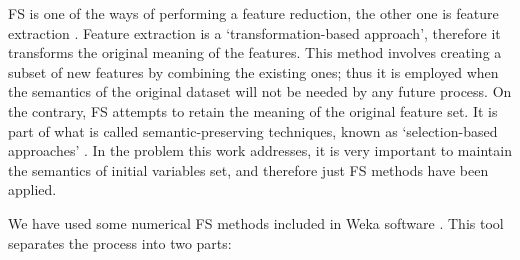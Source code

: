 \documentclass[a4paper,10pt,twocolumn,preprint,3p]{elsarticle}
\begin{document}
FS is one of the ways of performing a feature reduction, the other one is 
feature extraction \cite{kittler1986feature}. 
Feature extraction is a `transformation-based approach', therefore
it transforms the original meaning of the features. This method
involves creating a subset of new features by combining the
existing ones; thus it is employed when the semantics of the
original dataset will not be needed by any future process. On the
contrary, FS attempts to retain the meaning of the
original feature set. It is part of what is called semantic-preserving
techniques, known as `selection-based approaches' \cite{liu1998feature}. 
In the problem this work addresses, it is very important to maintain the 
semantics of initial variables set, and therefore just FS methods 
have been applied. 

We have used some numerical FS methods included in Weka software \cite{Hall2009,Witten2011}. This tool separates the process into two parts:
\end{document}
